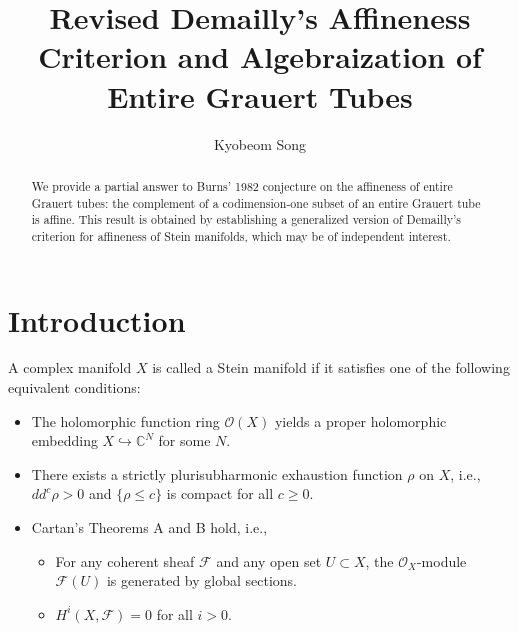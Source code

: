 \documentclass[a4paper, 12pt]{article}
\begin{document}
\title{Revised Demailly's Affineness Criterion and Algebraization of Entire Grauert Tubes}
\author{Kyobeom Song}
\date{}

\maketitle

\begin{abstract}
We provide a partial answer to Burns' 1982 conjecture on the affineness of entire Grauert tubes: the complement of a codimension-one subset of an entire Grauert tube is affine. This result is obtained by establishing a generalized version of Demailly's criterion for affineness of Stein manifolds, which may be of independent interest.

\end{abstract}
  
\section{Introduction}
A complex manifold $X$ is called a Stein manifold if it satisfies one of the following equivalent conditions:
\begin{itemize}
\item The holomorphic function ring $\mathcal{O}(X)$ yields a proper holomorphic embedding $X \hookrightarrow \mathbb{C}^N$ for some $N$.
\item There exists a strictly plurisubharmonic exhaustion function $\rho$ on $X$, i.e., $dd^c \rho > 0$ and $\{\rho \leq c\}$ is compact for all $c \geq 0$.
\item Cartan's Theorems A and B hold, i.e.,
\begin{itemize}
\item[(A)] For any coherent sheaf $\mathcal{F}$ and any open set $U \subset X$, the $\mathcal{O}_X$-module $\mathcal{F}(U)$ is generated by global sections.
\item[(B)] $H^i(X,\mathcal{F}) = 0$ for all $i > 0$.
\end{itemize}
\end{itemize}
\end{document}
